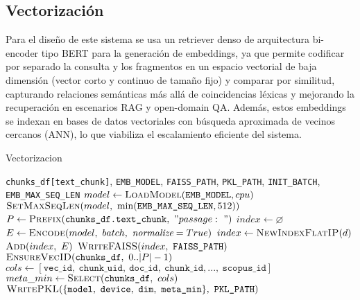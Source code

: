 \subsection{Vectorización}\label{subsec:vectorizacion}
Para el diseño de este sistema se usa un retriever denso de arquitectura bi-encoder tipo BERT para la generación de embeddings, ya que permite codificar por separado la 
consulta y los fragmentos en un espacio vectorial de baja dimensión (vector corto y continuo de tamaño fijo) y comparar por similitud, 
capturando relaciones semánticas más allá de coincidencias léxicas y mejorando la recuperación en escenarios RAG y open-domain QA.
Además, estos embeddings se indexan en bases de datos vectoriales con búsqueda aproximada de vecinos cercanos (ANN), lo que viabiliza el escalamiento eficiente del sistema\parencite{joshi2025vector}.
\begin{algorithmEN}[H]
  \caption{Vectorizacion }
  \begin{algorithmic}[1]
    \Require \texttt{chunks\_df[text\_chunk]}, \texttt{EMB\_MODEL}, \texttt{FAISS\_PATH}, \texttt{PKL\_PATH}, \texttt{INIT\_BATCH}, \texttt{EMB\_MAX\_SEQ\_LEN}
    \State $model \gets \textsc{LoadModel}(\texttt{EMB\_MODEL}, cpu)$ 
    \State $\textsc{SetMaxSeqLen}(model,\ \min(\texttt{EMB\_MAX\_SEQ\_LEN},512))$ 
    \State $P \gets \textsc{Prefix}(\texttt{chunks\_df.text\_chunk},\ "passage:\ ")$ 
    \State $index \gets \varnothing$ 
     
      \State $E \gets \textsc{Encode}(model,\ batch,\ \textit{normalize}=True)$ 
       \State $index \gets \textsc{NewIndexFlatIP}(d)$ \EndIf
      \State $\textsc{Add}(index,\ E)$ 
    \EndFor
    \State $\textsc{WriteFAISS}(index,\ \texttt{FAISS\_PATH})$ 
    \State $\textsc{EnsureVecID}(\texttt{chunks\_df},\ 0..|P|-1)$ 
  \State $cols \gets [\texttt{vec\_id},\ \texttt{chunk\_uid},\ \texttt{doc\_id},\ \texttt{chunk\_id},...,\ \texttt{scopus\_id}]$
  \State $meta\_min \gets \textsc{Select}(\texttt{chunks\_df},\ cols)$
    \State $\textsc{WritePKL}(\{\texttt{model},\ \texttt{device},\ \texttt{dim},\ \texttt{meta\_min}\},\ \texttt{PKL\_PATH})$

  \end{algorithmic}
\end{algorithmEN}


